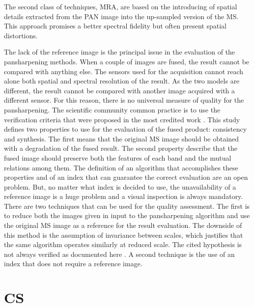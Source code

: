 \documentclass[12pt]{report}
\begin{document}
The second class of techniques, MRA, are based on the introducing of spatial details extracted from the PAN image into the up-sampled version of the MS. This approach promises a better spectral fidelity but often present spatial distortions.

The lack of the reference image is the principal issue in the evaluation of the pansharpening methods.
When a couple of images are fused, the result cannot be compared with anything else. The sensors used for the acquisition cannot reach alone both spatial and spectral resolution of the result. As the two models are different, the result cannot be compared with another image acquired with a different sensor.
For this reason, there is no universal measure of quality for the pansharpening. The scientific community common practice is to use the verification criteria that were proposed in the most credited work \cite{towaldetal}. This study defines two properties to use for the evaluation of the fused product: consistency and synthesis. The first means that the original MS image should be obtained with a degradation of the fused result.
The second property describe that the fused image should preserve both the features of each band and the mutual relations among them. The definition of an algorithm that accomplishes these properties and of an index that can guarantee the correct evaluation are an open problem. But, no matter what index is decided to use, the unavailability of a reference image is a huge problem and a visual inspection is always mandatory. There are two techniques that can be used for the quality assessment. The first is to reduce both the images given in input to the pansharpening algorithm and use the original MS image as a reference for the result evaluation. The downside of this method is the assumption of invariance between scales, which justifies that the same algorithm operates similarly at reduced scale. The cited hypothesis  is not always verified as documented here \cite{scaleinvariance1} \cite{towaldetal}. A second technique is the use of an index that does not require a reference image.


\section{CS}
\end{document}
